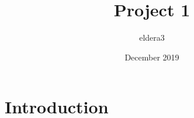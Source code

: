 \documentclass{article}
\title{Project 1}
\author{eldera3 }
\date{December 2019}
\begin{document}
\maketitle

\section{Introduction}
\end{document}
